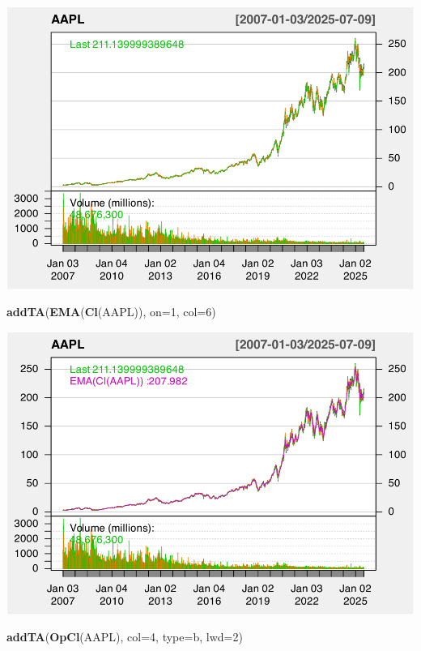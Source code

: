 \documentclass[]{ctexbook}
\newenvironment{Shaded}{\begin{snugshade}}{\end{snugshade}}
\newcommand{\AttributeTok}[1]{\textcolor[rgb]{0.13,0.29,0.53}{#1}}
\newcommand{\DecValTok}[1]{\textcolor[rgb]{0.00,0.00,0.81}{#1}}
\newcommand{\FunctionTok}[1]{\textcolor[rgb]{0.13,0.29,0.53}{\textbf{#1}}}
\newcommand{\NormalTok}[1]{#1}
\newcommand{\StringTok}[1]{\textcolor[rgb]{0.31,0.60,0.02}{#1}}
\begin{document}
\includegraphics[width=0.9\linewidth]{quantmod_files/figure-latex/newta-1}

\begin{Shaded}
\begin{Highlighting}[]
\FunctionTok{addTA}\NormalTok{(}\FunctionTok{EMA}\NormalTok{(}\FunctionTok{Cl}\NormalTok{(AAPL)), }\AttributeTok{on=}\DecValTok{1}\NormalTok{, }\AttributeTok{col=}\DecValTok{6}\NormalTok{)}
\end{Highlighting}
\end{Shaded}

\includegraphics[width=0.9\linewidth]{quantmod_files/figure-latex/newta-2}

\begin{Shaded}
\begin{Highlighting}[]
\FunctionTok{addTA}\NormalTok{(}\FunctionTok{OpCl}\NormalTok{(AAPL), }\AttributeTok{col=}\DecValTok{4}\NormalTok{, }\AttributeTok{type=}\StringTok{\textquotesingle{}b\textquotesingle{}}\NormalTok{, }\AttributeTok{lwd=}\DecValTok{2}\NormalTok{)}
\end{Highlighting}
\end{Shaded}
\end{document}
